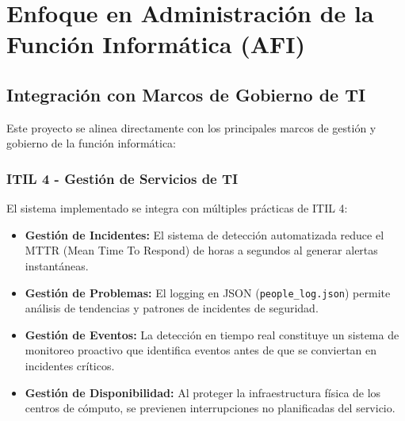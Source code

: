 \documentclass[12pt, a4paper]{article}
\begin{document}
\section{Enfoque en Administración de la Función Informática (AFI)}

\subsection{Integración con Marcos de Gobierno de TI}

Este proyecto se alinea directamente con los principales marcos de gestión y gobierno de la función informática:

\subsubsection{ITIL 4 - Gestión de Servicios de TI}
El sistema implementado se integra con múltiples prácticas de ITIL 4:
\begin{itemize}
\item \textbf{Gestión de Incidentes:} El sistema de detección automatizada reduce el MTTR (Mean Time To Respond) de horas a segundos al generar alertas instantáneas.
\item \textbf{Gestión de Problemas:} El logging en JSON (\texttt{people\_log.json}) permite análisis de tendencias y patrones de incidentes de seguridad.
\item \textbf{Gestión de Eventos:} La detección en tiempo real constituye un sistema de monitoreo proactivo que identifica eventos antes de que se conviertan en incidentes críticos.
\item \textbf{Gestión de Disponibilidad:} Al proteger la infraestructura física de los centros de cómputo, se previenen interrupciones no planificadas del servicio.
\end{itemize}
\end{document}
